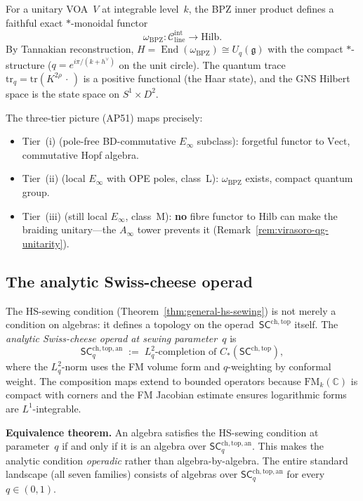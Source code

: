\documentclass[11pt]{article}
\newcommand{\cC}{\mathcal{C}}
\newcommand{\fg}{\mathfrak{g}}
\newcommand{\SCchtop}{\mathsf{SC}^{\mathrm{ch,top}}}
\newcommand{\FM}{\mathrm{FM}}
\newcommand{\End}{\operatorname{End}}
\providecommand{\bC}{\mathbb{C}}
\begin{document}
For a unitary VOA~$V$ at integrable level~$k$, the BPZ inner
product defines a faithful exact $*$-monoidal functor
\[
  \omega_{\mathrm{BPZ}}\colon
  \cC_{\mathrm{line}}^{\mathrm{int}} \longrightarrow \mathrm{Hilb}.
\]
By Tannakian reconstruction, $H = \End(\omega_{\mathrm{BPZ}})
\cong U_q(\fg)$ with the compact $*$-structure
($q = e^{i\pi/(k+h^\vee)}$ on the unit circle).
The quantum trace $\mathrm{tr}_q = \mathrm{tr}(K^{2\rho}\,
\cdot\,)$ is a positive functional (the Haar state), and the
GNS Hilbert space is the state space on
$S^1 \times D^2$.

The three-tier picture (AP51) maps precisely:
\begin{itemize}[nosep]
\item Tier~(i) (pole-free BD-commutative $E_\infty$ subclass): forgetful functor to
  $\mathrm{Vect}$, commutative Hopf algebra.
\item Tier~(ii) (local $E_\infty$ with OPE poles, class~L): $\omega_{\mathrm{BPZ}}$
  exists, compact quantum group.
\item Tier~(iii) (still local $E_\infty$, class~M): \textbf{no} fibre functor to
  $\mathrm{Hilb}$ can make the braiding unitary---the
  $A_\infty$ tower prevents it
  (Remark~\ref{rem:virasoro-qg-unitarity}).
\end{itemize}

\subsection{The analytic Swiss-cheese operad}
\label{sec:analytic-sc-operad}

The HS-sewing condition
(Theorem~\ref*{thm:general-hs-sewing})
is not merely a condition on algebras: it defines a topology
on the operad~$\SCchtop$ itself.  The \emph{analytic
Swiss-cheese operad at sewing parameter~$q$} is
\[
  \mathsf{SC}^{\mathrm{ch,top,an}}_q
  \;:=\;
  L^2_q\text{-completion of }
  C_*(\SCchtop),
\]
where the $L^2_q$-norm uses the FM volume form and
$q$-weighting by conformal weight.  The composition maps
extend to bounded operators because $\FM_k(\bC)$ is compact
with corners and the FM Jacobian estimate ensures logarithmic
forms are $L^1$-integrable.

\textbf{Equivalence theorem.}
An algebra satisfies the HS-sewing condition at
parameter~$q$ if and only if it is an algebra over
$\mathsf{SC}^{\mathrm{ch,top,an}}_q$.  This makes the analytic
condition \emph{operadic} rather than algebra-by-algebra.
The entire standard landscape (all seven families) consists
of algebras over $\mathsf{SC}^{\mathrm{ch,top,an}}_q$ for every
$q \in (0,1)$.
\end{document}

